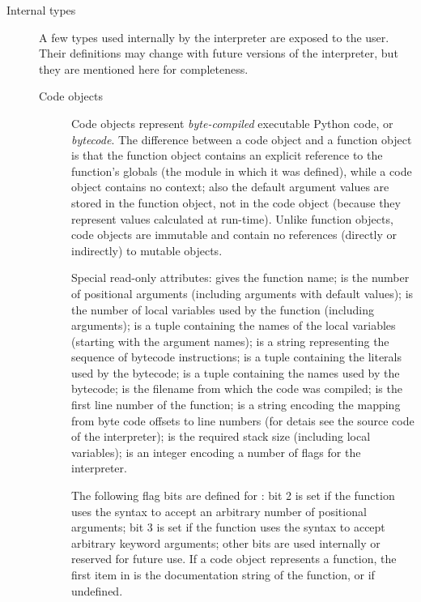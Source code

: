 \begin{description}
\item[Internal types]
A few types used internally by the interpreter are exposed to the user.
Their definitions may change with future versions of the interpreter,
but they are mentioned here for completeness.

\begin{description}

\item[Code objects]
Code objects represent \emph{byte-compiled} executable Python code, or 
\emph{bytecode}.
The difference between a code
object and a function object is that the function object contains an
explicit reference to the function's globals (the module in which it
was defined), while a code object contains no context; 
also the default argument values are stored in the function object,
not in the code object (because they represent values calculated at
run-time).  Unlike function objects, code objects are immutable and
contain no references (directly or indirectly) to mutable objects.

Special read-only attributes:  gives
the function name; 
is the number of positional arguments (including arguments with
default values);  is the number
of local variables used by the function (including arguments);
 is a tuple containing the
names of the local variables (starting with the argument names);
 is a string representing the sequence
of bytecode instructions;  is a
tuple containing the literals used by the bytecode;
 is a tuple containing the names used 
by the bytecode;  is the
filename from which the code was compiled;
 is the first line number 
of the function;  is a string 
encoding the mapping from byte code offsets to line numbers (for
detais see the source code of the interpreter);
 is the required stack size
(including local variables);  is an
integer encoding a number of flags for the interpreter.

The following flag bits are defined for : bit 2 is set
if the function uses the  syntax to accept an
arbitrary number of positional arguments; bit 3 is set if the function
uses the  syntax to accept arbitrary keyword
arguments; other bits are used internally or reserved for future use.
If a code object represents a function, the first item in
 is the documentation string of the
function, or  if undefined.


\end{description}
\end{description}
